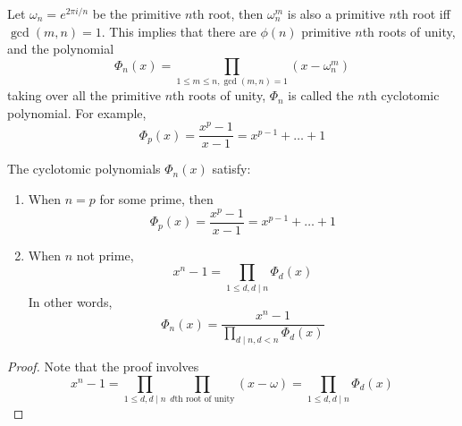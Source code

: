 \documentclass[openany]{book}
\newcommand{\F}{\mathbb{F}}
\newcommand{\om}{\omega}
\begin{document}







\begin{defn}
    Let $\om_n=e^{2\pi i/n}$ be the primitive $n$th root, then $\om_n^m$ is also a primitive $n$th root iff $\gcd(m,n)=1$. This implies that there are $\phi(n)$ primitive $n$th roots of unity, and the polynomial 
    \begin{equation*}
        \Phi_n(x)=\prod_{1\leq m\leq n, \gcd(m,n)=1}(x-\om_n^m)
    \end{equation*}
    taking over all the primitive $n$th roots of unity, $\Phi_n$ is called the $n$th cyclotomic polynomial. For example, 
    \begin{equation*}
        \Phi_p(x)=\frac{x^p-1}{x-1}=x^{p-1}+\dots+1
    \end{equation*}
\end{defn}


\begin{prop}
    The cyclotomic polynomials $\Phi_n(x)$ satisfy:
    \begin{enumerate}
        \item When $n=p$ for some prime, then 
        \begin{equation*}
            \Phi_p(x)=\frac{x^p-1}{x-1}=x^{p-1}+\dots+1
        \end{equation*}
        \item When $n$ not prime, 
        \begin{equation*}
            x^n-1=\prod_{1\leq d, d \mid n} \Phi_d(x)
        \end{equation*}
        In other words,
        \begin{equation*}
            \Phi_n(x)=\frac{x^n-1}{\prod_{d\mid n, d<n}\Phi_d(x)}
        \end{equation*}
    \end{enumerate}
\end{prop}
\begin{proof}
    Note that the proof involves 
    \begin{equation*}
        x^n-1=\prod_{1\leq d, d\mid n}\prod_{d\text{th root of unity}}(x-\om)=\prod_{1\leq d, d\mid n}\Phi_d(x)
    \end{equation*}
\end{proof}
\end{document}
